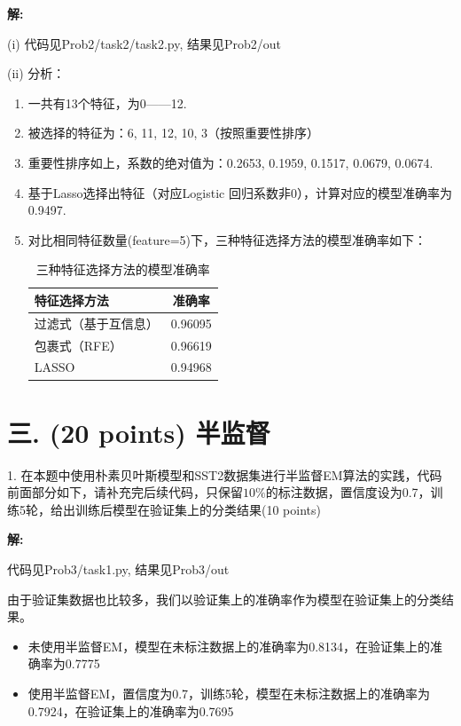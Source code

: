 \documentclass[8pt]{article}
\begin{document}
\textbf{\large 解:}

(i) {\color{red}代码见Prob2/task2/task2.py, 结果见Prob2/out}

(ii) 分析：
\begin{enumerate}[label=(\alph*)]
    \item 一共有13个特征，为0——12.
    \item 被选择的特征为：6, 11, 12, 10, 3（按照重要性排序）
    \item 重要性排序如上，系数的绝对值为：0.2653, 0.1959, 0.1517, 0.0679, 0.0674.
    \item 基于Lasso选择出特征（对应Logistic 回归系数非0），计算对应的模型准确率为0.9497.
    \item 对比相同特征数量(feature=5)下，三种特征选择方法的模型准确率如下：
    \begin{table}[H]
        \centering
        \begin{tabular}{l|c}
            \toprule
            特征选择方法 & 准确率 \\
            \midrule
            过滤式（基于互信息） & 0.96095 \\
            包裹式（RFE） & 0.96619 \\
            LASSO & 0.94968 \\
            \bottomrule
        \end{tabular}
        \caption{三种特征选择方法的模型准确率}
        \label{tab:Three Feature Selection Methods Comparison}
    \end{table}
\end{enumerate}
\vspace{3em}


\newpage
\section*{三. (20 points) 半监督}
1. 在本题中使用朴素贝叶斯模型和SST2数据集进行半监督EM算法的实践，代码前面部分如下，请补充完后续代码，只保留$10\%$的标注数据，置信度设为0.7，训练5轮，给出训练后模型在验证集上的分类结果(10 points)

\textbf{\large 解:}

{\color{red}代码见Prob3/task1.py, 结果见Prob3/out}

由于验证集数据也比较多，我们以验证集上的准确率作为模型在验证集上的分类结果。

\begin{itemize}
    \item 未使用半监督EM，模型在未标注数据上的准确率为0.8134，在验证集上的准确率为0.7775
    \item 使用半监督EM，置信度为0.7，训练5轮，模型在未标注数据上的准确率为0.7924，在验证集上的准确率为0.7695
\end{itemize}
\vspace{1em}
\end{document}

